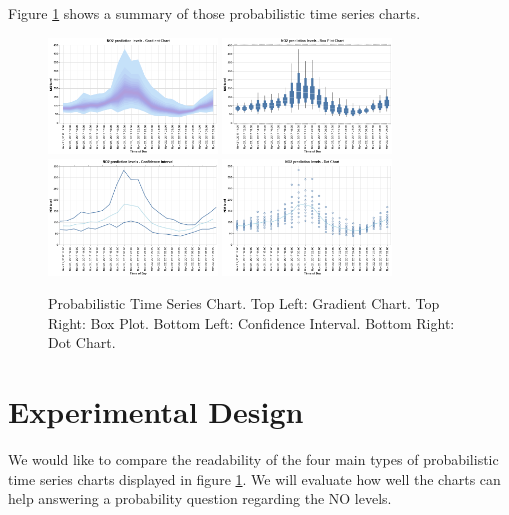 \documentclass[a4paper,3p,sort&compress]{elsarticle}
\begin{document}
Figure \ref{figure:charts} shows a summary of those probabilistic time series charts.

\begin{figure}
  \centering
  \includegraphics[width=0.4\textwidth]{gradient} 
  \includegraphics[width=0.4\textwidth]{boxplot}
  \includegraphics[width=0.4\textwidth]{ci} 
  \includegraphics[width=0.4\textwidth]{dot}
  \caption{\label{figure:charts} Probabilistic Time Series Chart. 
  Top Left: Gradient Chart. Top Right: Box Plot. 
  Bottom Left: Confidence Interval. Bottom Right: Dot Chart.  }
\end{figure}

\section{Experimental Design}
\label{sec:exp_design}

We would like to compare the readability of the four main types of probabilistic time series charts displayed in figure 
\ref{figure:charts}. We will evaluate how well the charts can help answering a probability question regarding the NO levels.
\end{document}
